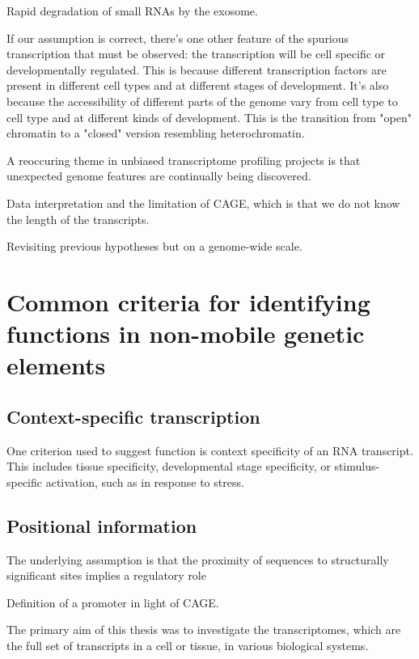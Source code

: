 Rapid degradation of small RNAs by the exosome.

If our assumption is correct, there's one other feature of the spurious transcription that must be observed: the transcription will be cell specific or developmentally regulated. This is because different transcription factors are present in different cell types and at different stages of development. It's also because the accessibility of different parts of the genome vary from cell type to cell type and at different kinds of development. This is the transition from "open" chromatin to a "closed" version resembling heterochromatin.

A reoccuring theme in unbiased transcriptome profiling projects is that unexpected genome features are continually being discovered.

Data interpretation and the limitation of CAGE, which is that we do not know the length of the transcripts.

Revisiting previous hypotheses but on a genome-wide scale.

\section{Common criteria for identifying functions in non-mobile genetic elements}

\subsection{Context-specific transcription}

One criterion used to suggest function is context specificity of an RNA transcript. This includes tissue specificity, developmental stage specificity, or stimulus-specific activation, such as in response to stress.

\subsection{Positional information}

The underlying assumption is that the proximity of sequences to structurally significant sites implies a regulatory role

Definition of a promoter in light of CAGE.

The primary aim of this thesis was to investigate the transcriptomes, which are the full set of transcripts in a cell or tissue, in various biological systems.

